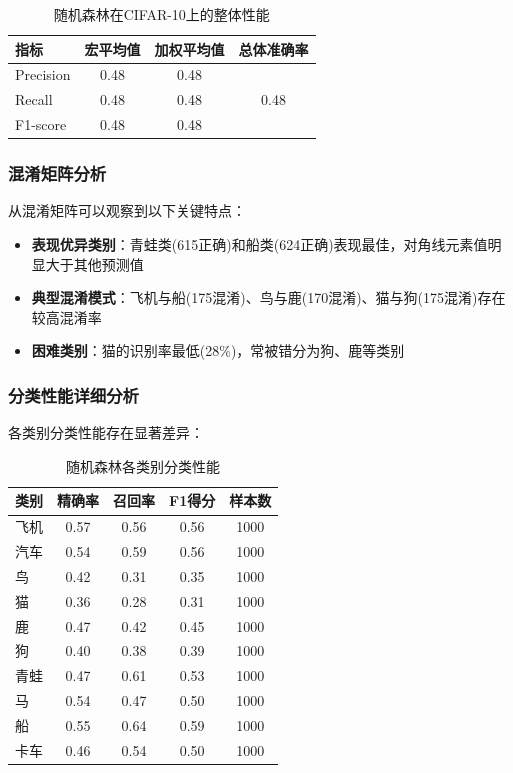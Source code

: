 \documentclass[UTF8]{report}
\theoremstyle{MyLineTheoremStyle} %
\theoremstyle{MyBlockTheoremStyle} %
\theoremstyle{MySubsubsectionStyle} %
\begin{document}
\begin{table}[h]
\centering
\caption{随机森林在CIFAR-10上的整体性能}
\begin{tabular}{l c c c}
\toprule
\textbf{指标} & \textbf{宏平均值} & \textbf{加权平均值} & \textbf{总体准确率} \\
\midrule
Precision & 0.48 & 0.48 & \multirow{3}{*}{0.48} \\
Recall & 0.48 & 0.48 & \\
F1-score & 0.48 & 0.48 & \\
\bottomrule
\end{tabular}
\end{table}

\subsubsection{混淆矩阵分析}
从混淆矩阵可以观察到以下关键特点：
\begin{itemize}
    \item \textbf{表现优异类别}：青蛙类(615正确)和船类(624正确)表现最佳，对角线元素值明显大于其他预测值
    \item \textbf{典型混淆模式}：飞机与船(175混淆)、鸟与鹿(170混淆)、猫与狗(175混淆)存在较高混淆率
    \item \textbf{困难类别}：猫的识别率最低(28\%)，常被错分为狗、鹿等类别
\end{itemize}

\subsubsection{分类性能详细分析}
各类别分类性能存在显著差异：

\begin{table}[h]
\centering
\caption{随机森林各类别分类性能}
\label{tab:rf_class_performance}
\begin{tabular}{l c c c c}
\toprule
\textbf{类别} & \textbf{精确率} & \textbf{召回率} & \textbf{F1得分} & \textbf{样本数} \\
\midrule
飞机 & 0.57 & 0.56 & 0.56 & 1000 \\
汽车 & 0.54 & 0.59 & 0.56 & 1000 \\
鸟 & 0.42 & 0.31 & 0.35 & 1000 \\
猫 & 0.36 & 0.28 & 0.31 & 1000 \\
鹿 & 0.47 & 0.42 & 0.45 & 1000 \\
狗 & 0.40 & 0.38 & 0.39 & 1000 \\
青蛙 & 0.47 & 0.61 & 0.53 & 1000 \\
马 & 0.54 & 0.47 & 0.50 & 1000 \\
船 & 0.55 & 0.64 & 0.59 & 1000 \\
卡车 & 0.46 & 0.54 & 0.50 & 1000 \\
\bottomrule
\end{tabular}
\end{table}
\end{document}
